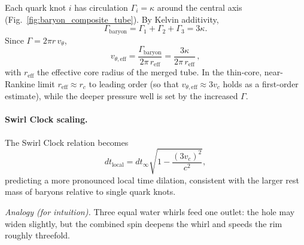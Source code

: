 \documentclass[reprint,aps,onecolumn,nofootinbib]{revtex4-2}
\begin{document}
    Each quark knot $i$ has circulation $\Gamma_i = \kappa$ around the central axis (Fig.~\ref{fig:baryon_composite_tube}).
        By Kelvin additivity,
        \begin{equation}
        \Gamma_{\mathrm{baryon}}=\Gamma_1+\Gamma_2+\Gamma_3=3\kappa.
        \end{equation}
        Since $\Gamma=2\pi r\,v_\theta$,
        \begin{equation}
        \boxed{\;
        v_{\theta,\mathrm{eff}}=\frac{\Gamma_{\mathrm{baryon}}}{2\pi\,r_{\mathrm{eff}}}
            =\frac{3\kappa}{2\pi\,r_{\mathrm{eff}}}\,,
            \;}
        \end{equation}
        with $r_{\mathrm{eff}}$ the effective core radius of the merged tube. In the thin-core, near-Rankine limit $r_{\mathrm{eff}}\approx r_c$ to leading order (so that $v_{\theta,\mathrm{eff}}\approx 3 v_c$ holds as a first-order estimate), while the deeper pressure well is set by the increased $\Gamma$.

        \paragraph{Swirl Clock scaling.}
        The Swirl Clock relation becomes
        \begin{equation}
        dt_{\mathrm{local}} = dt_\infty \sqrt{1 - \frac{(3 v_c)^2}{c^2}},
        \end{equation}
        predicting a more pronounced local time dilation, consistent with the larger rest mass of baryons relative to single quark knots.

            \emph{Analogy (for intuition).} Three equal water whirls feed one outlet: the hole may widen slightly, but the combined spin deepens the whirl and speeds the rim roughly threefold.
\end{document}

